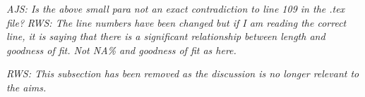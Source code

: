 \documentclass{ametsoc}
\begin{document}

\emph{AJS: Is the above small para not an exact contradiction to line 109 in the .tex file?}
\emph{RWS: The line numbers have been changed but if I am reading the correct line, it is saying that there is a significant relationship between length and goodness of fit. Not NA\% and goodness of fit as here.}

\emph{RWS: This subsection has been removed as the discussion is no longer relevant to the aims.}

\end{document}
